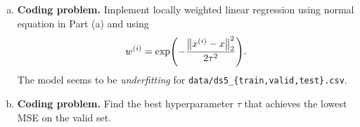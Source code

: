 \documentclass[12pt,letterpaper,boxed]{hmcpset}
\newcommand{\xx}{x^{(i)}}
\newcommand{\ww}{w^{(i)}}
\begin{document}
\begin{solution}
\begin{enumerate}[(a)]
  \item \textbf{Coding problem.} Implement locally weighted linear regression using normal equation in Part (a) and using
  \[
  \ww = \exp(- \frac{\norm{\xx - x}_2^2}{2 \tau^2}).
  \]
  The model seems to be \emph{underfitting} for \verb|data/ds5_{train,valid,test}.csv|.

  \item \textbf{Coding problem.} Find the best hyperparameter $\tau$ that achieves the lowest MSE on the valid set.
\end{enumerate}
\end{solution}
\end{document}
